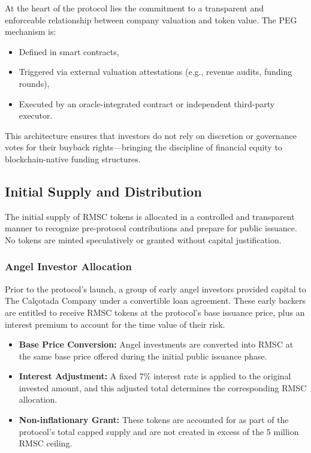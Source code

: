 \documentclass[conference]{IEEEtran}
\begin{document}
At the heart of the protocol lies the commitment to a transparent and enforceable relationship between company valuation and token value. The PEG mechanism is:
\begin{itemize}
    \item Defined in smart contracts,
    \item Triggered via external valuation attestations (e.g., revenue audits, funding rounds),
    \item Executed by an oracle-integrated contract or independent third-party executor.
\end{itemize}

This architecture ensures that investors do not rely on discretion or governance votes for their buyback rights—bringing the discipline of financial equity to blockchain-native funding structures.

\subsection{Initial Supply and Distribution}

The initial supply of RMSC tokens is allocated in a controlled and transparent manner to recognize pre-protocol contributions and prepare for public issuance. No tokens are minted speculatively or granted without capital justification.

\subsubsection{Angel Investor Allocation}

Prior to the protocol's launch, a group of early angel investors provided capital to The Calçotada Company under a convertible loan agreement. These early backers are entitled to receive RMSC tokens at the protocol’s base issuance price, plus an interest premium to account for the time value of their risk.

\begin{itemize}
    \item \textbf{Base Price Conversion:} Angel investments are converted into RMSC at the same base price offered during the initial public issuance phase.
    \item \textbf{Interest Adjustment:} A fixed 7\% interest rate is applied to the original invested amount, and this adjusted total determines the corresponding RMSC allocation.
    \item \textbf{Non-inflationary Grant:} These tokens are accounted for as part of the protocol's total capped supply and are not created in excess of the 5 million RMSC ceiling.
\end{itemize}
\end{document}
